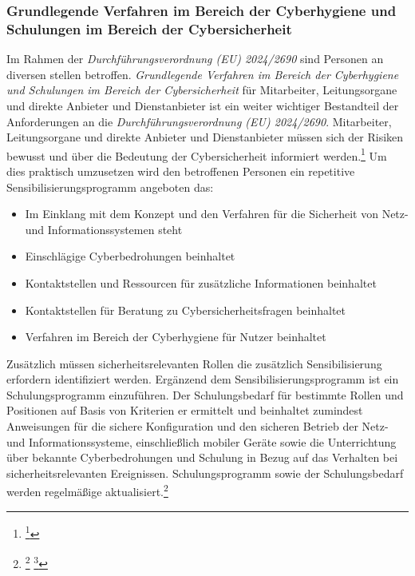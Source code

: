 \documentclass[11pt,a4paper,hidelinks]{article}   %
\begin{document}
            \subsubsection{Grundlegende Verfahren im Bereich der Cyberhygiene und Schulungen im Bereich der Cybersicherheit}
            Im Rahmen der \emph{Durchführungsverordnung (EU) 2024/2690} sind Personen an diversen stellen betroffen. \emph{Grundlegende Verfahren im Bereich der Cyberhygiene und Schulungen im Bereich der Cybersicherheit} für Mitarbeiter, Leitungsorgane und direkte Anbieter und Dienstanbieter ist ein weiter wichtiger Bestandteil der Anforderungen an die \emph{Durchführungsverordnung (EU) 2024/2690}. Mitarbeiter, Leitungsorgane und direkte Anbieter und Dienstanbieter müssen sich der Risiken bewusst und über die Bedeutung der Cybersicherheit informiert werden.\footnote{\footcite[Vgl.][, Anhang, Nummer 8.1.1.]{EU2024-2690}} Um dies praktisch umzusetzen wird den betroffenen Personen ein repetitive Sensibilisierungsprogramm angeboten das:
            \begin{itemize}
                \item Im Einklang mit dem Konzept und den Verfahren für die Sicherheit von Netz- und Informationssystemen steht
                \item Einschlägige Cyberbedrohungen beinhaltet
                \item Kontaktstellen und Ressourcen für zusätzliche Informationen beinhaltet
                \item Kontaktstellen für Beratung zu Cybersicherheitsfragen beinhaltet
                \item Verfahren im Bereich der Cyberhygiene für Nutzer beinhaltet
            \end{itemize} Zusätzlich müssen sicherheitsrelevanten Rollen die zusätzlich Sensibilisierung erfordern identifiziert werden. Ergänzend dem Sensibilisierungsprogramm ist ein Schulungsprogramm einzuführen. Der Schulungsbedarf für bestimmte Rollen und Positionen auf Basis von Kriterien er ermittelt und beinhaltet zumindest Anweisungen für die sichere Konfiguration und den sicheren Betrieb der Netz- und Informationssysteme, einschließlich mobiler Geräte sowie die Unterrichtung über bekannte Cyberbedrohungen und Schulung in Bezug auf das Verhalten bei sicherheitsrelevanten Ereignissen. Schulungsprogramm sowie der Schulungsbedarf werden regelmäßige aktualisiert.\footnote{
                \footcite[Vgl.][, Anhang, Nummer 8.1.3., 8.2.1., 8.2.2. \& 8.2.4.]{EU2024-2690}
                \footcite[Vgl.][§30 Absatz 2, Nummer 7]{NIS2UmsuCG} %
            }
\end{document}
